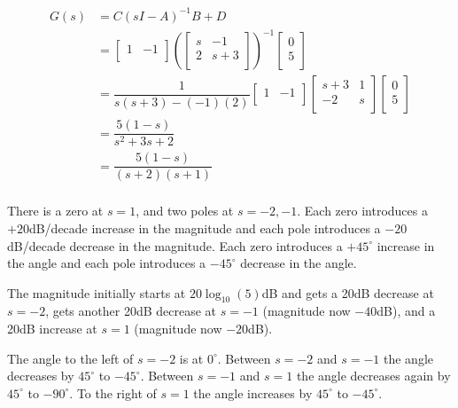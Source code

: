 \documentclass[11pt]{article}
\begin{document}
\begin{align*}
    G(s) &= C(sI - A)^{-1}B + D \\
    & = \begin{bmatrix}
        1 & -1 \\
    \end{bmatrix}
    \left(
        \begin{bmatrix}
            s & -1 \\
            2 & s + 3 \\
        \end{bmatrix}
    \right)^{-1}
    \begin{bmatrix}
        0 \\
        5 \\
    \end{bmatrix}
    \\
    &=
    \dfrac{1}{s(s + 3) - (-1)(2)}
    \begin{bmatrix}
        1 & -1 \\
    \end{bmatrix}
    \begin{bmatrix}
        s + 3 & 1 \\
        -2 & s \\
    \end{bmatrix}
    \begin{bmatrix}
        0 \\
        5 \\
    \end{bmatrix}
    \\
    &= \dfrac{5(1 - s)}{s^2 + 3s + 2} \\
    &= \dfrac{5(1 - s)}{(s + 2)(s + 1)} \\
\end{align*}

There is a zero at $s = 1$, and two poles at $s = -2, -1$. Each zero introduces a $+20$dB/decade increase in the magnitude and each pole introduces a $-20$dB/decade decrease in the magnitude. Each zero introduces a $+45^\circ$ increase in the angle and each pole introduces a $-45^\circ$ decrease in the angle.

The magnitude initially starts at $20 \log_{10}(5)$dB and gets a 20dB decrease at $s = -2$, gets another 20dB decrease at $s = -1$ (magnitude now $-40$dB), and a 20dB increase at $s = 1$ (magnitude now $-20$dB).

The angle to the left of $s = -2$ is at $0^\circ$. Between $s = -2$ and $s = -1$ the angle decreases by $45^\circ$ to $-45^\circ$. Between $s = -1$ and $s = 1$ the angle decreases again by $45^\circ$ to $-90^\circ$. To the right of $s = 1$ the angle increases by $45^\circ$ to $-45^\circ$.
\end{document}
